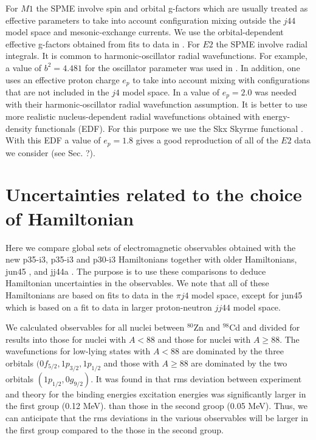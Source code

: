 \documentclass[aps,prl,twocolumn,tightenlines,superscriptaddress,showpacs]{revtex4-1}
\begin{document}
For $  M1  $ the SPME involve spin and orbital g-factors which
are usually treated as effective parameters to take into account
configuration mixing outside the $  j44  $ model space
and mesonic-exchange currents. We use the
orbital-dependent effective g-factors
obtained from fits to data in \cite{jw88em}.
For $  E2  $ the SPME involve radial integrals.
It is common to harmonic-oscillator radial wavefunctions.
For example,  a value of $  b^{2}=4.481  $ for the oscillator parameter
was used in \cite{jw88em}.
In addition, one uses an effective proton charge $  e_{p}  $
to take into account mixing with configurations
that are not included in the $  j4  $ model space.
In \cite{jw88em} a value of $  e_{p}=2.0  $ was needed with
their harmonic-oscillator radial wavefunction assumption.
It is better to use more realistic nucleus-dependent
radial wavefunctions obtained with energy-density functionals (EDF).
For this purpose we use the Skx Skyrme functional \cite{skx}.
With this EDF a value of $  e_{p}=1.8  $ gives a good
reproduction of  all of the $  E2  $ data we consider (see Sec. ?).


\section{Uncertainties related to the choice of Hamiltonian}

Here we compare global sets of electromagnetic observables obtained with the
new p35-i3, p35-i3 and p30-i3 Hamiltonians together with
older Hamiltonians, jun45 \cite{jun45}, and jj44a \cite{jj44a}.
The purpose is to use these comparisons to deduce Hamiltonian uncertainties
in the observables. We note that all of these Hamiltonians are
based on fits to data in the $  \pi j4  $ model space, except
for jun45 which is based on a fit to data in larger
proton-neutron $  jj44  $ model space.

We calculated observables for all nuclei between $^{80}$Zn
and $^{98}$Cd and divided for results into those for nuclei with $  A < 88  $
and those for nuclei with $  A \geq 88  $. The
wavefunctions for low-lying states with $  A<88  $ are dominated
by the three orbitals $  (0f_{5/2},1p_{3/2},1p_{1/2}  $
and those with  $  A \geq 88  $ are dominated by
the two orbitals $  (1p_{1/2},0g_{9/2})  $. It was found
in \cite{p35i3} that rms deviation between experiment
and theory for the binding energies excitation
energies was significantly larger in the first group (0.12 MeV).
than those in the second groop (0.05 MeV). Thus,
we can anticipate that the rms deviations in the
various observables will be larger in the first
group compared to the those in the second group.
\end{document}
